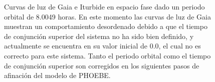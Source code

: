 \begin{figure}[!h]
	\caption{Curvas de luz de Gaia e Iturbide en espacio fase dado un periodo
		orbital de 8.0049 horas. En este momento las curvas de luz de Gaia
		muestran un comportamiento desordenado debido a que el tiempo de
		conjunción superior del sistema no ha sido bien definido, y actualmente
		se encuentra en su valor inicial de 0.0, el cual no es correcto para
		este sistema. Tanto el periodo orbital como el tiempo de conjunción
		superior son corregidos en los siguientes pasos de afinación del modelo
		de PHOEBE.}
	\label{gaiaIturbidePhaseFold}
\end{figure}